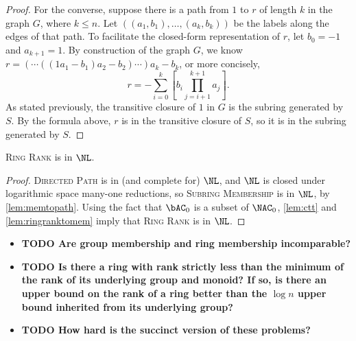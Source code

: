 \documentclass{article}
\newcommand{\todo}[1]{\textbf{TODO #1}}
\begin{document}
\begin{proof}
  For the converse, suppose there is a path from $1$ to $r$ of length $k$ in the graph $G$, where $k \leq n$.
  Let $((a_1, b_1), \dotsc, (a_k, b_k))$ be the labels along the edges of that path.
  To facilitate the closed-form representation of $r$, let $b_0 = -1$ and $a_{k + 1} = 1$.
  By construction of the graph $G$, we know $r = (\dotsb ((1 a_1 - b_1) a_2 - b_2) \dotsb) a_k - b_k$, or more concisely,
  \begin{equation*}
    r = -\sum_{i = 0}^k \left[b_i \prod_{j = i + 1}^{k + 1} a_j\right].
  \end{equation*}
  As stated previously, the transitive closure of $1$ in $G$ is the subring generated by $S$.
  By the formula above, $r$ is in the transitive closure of $S$, so it is in the subring generated by $S$.
\end{proof}

\begin{theorem}\label{thm:ringrank}
  \textsc{Ring Rank} is in $\NL$.
\end{theorem}
\begin{proof}
  \textsc{Directed Path} is in (and complete for) $\NL$, and $\NL$ is closed under logarithmic space many-one reductions, so \textsc{Subring Membership} is in $\NL$, by \autoref{lem:memtopath}.
  Using the fact that $\bAC_0$ is a subset of $\NAC_0$, \autoref{lem:ctt} and \autoref{lem:ringranktomem} imply that \textsc{Ring Rank} is in $\NL$.
\end{proof}

\begin{itemize}
\item \todo{Are group membership and ring membership incomparable?}
\item \todo{Is there a ring with rank strictly less than the minimum of the rank of its underlying group and monoid?
  If so, is there an upper bound on the rank of a ring better than the $\log n$ upper bound inherited from its underlying group?}
\item \todo{How hard is the succinct version of these problems?}
\end{itemize}

\printbibliography
\end{document}
